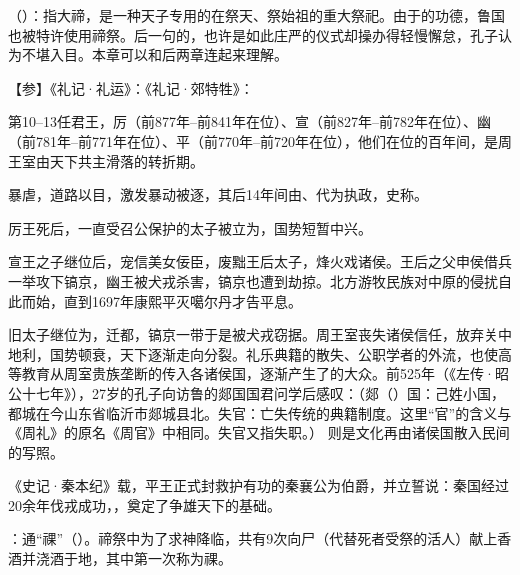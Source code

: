 {
\item {}（）：指大禘，是一种天子专用的在祭天、祭始祖的重大祭祀。由于的功德，鲁国也被特许使用禘祭。后一句的，也许是如此庄严的仪式却操办得轻慢懈怠，孔子认为不堪入目。本章可以和后两章连起来理解。

【参】《礼记·礼运》：《礼记·郊特牲》： %

第10--13任君王，厉（前877年--前841年在位）、宣（前827年--前782年在位）、幽（前781年--前771年在位）、平（前770年--前720年在位），他们在位的百年间，是周王室由天下共主滑落的转折期。
\begin{lyenumerate}
\item {}暴虐，道路以目，激发暴动被逐，其后14年间由、代为执政，史称。
\item 厉王死后，一直受召公保护的太子被立为，国势短暂中兴。
\item {}宣王之子继位后，宠信美女佞臣，废黜王后太子，烽火戏诸侯。王后之父申侯借兵一举攻下镐京，幽王被犬戎杀害，镐京也遭到劫掠。北方游牧民族对中原的侵扰自此而始，直到1697年康熙平灭噶尔丹才告平息。
\item 旧太子继位为，迁都，镐京一带于是被犬戎窃据。周王室丧失诸侯信任，放弃关中地利，国势顿衰，天下逐渐走向分裂。礼乐典籍的散失、公职学者的外流，也使高等教育从周室贵族垄断的传入各诸侯国，逐渐产生了的大众。前525年（《左传·昭公十七年》），27岁的孔子向访鲁的郯国国君问学后感叹：（郯（）国：己姓小国，都城在今山东省临沂市郯城县北。失官：亡失传统的典籍制度。这里“官”的含义与《周礼》的原名《周官》中相同。失官又指失职。） 则是文化再由诸侯国散入民间的写照。
\item {}《史记·秦本纪》载，平王正式封救护有功的秦襄公为伯爵，并立誓说：秦国经过20余年伐戎成功，，奠定了争雄天下的基础。
\end{lyenumerate}

\item {}：通“祼”（）。禘祭中为了求神降临，共有9次向尸（代替死者受祭的活人）献上香酒并浇酒于地，其中第一次称为祼。
}
{}


